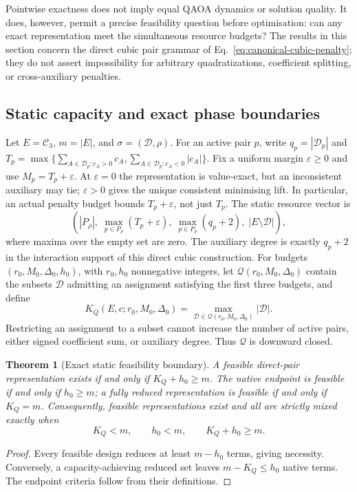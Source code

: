 \documentclass[a4paper,onecolumn,11pt,unpublished]{quantumarticle}
\newtheorem{theorem}[theorem]{Theorem}
\theoremstyle{remark}
\begin{document}
Pointwise exactness does not imply equal QAOA dynamics or solution quality.
It does, however, permit a precise feasibility question before optimisation:
can any exact representation meet the simultaneous resource budgets?
The results in this section concern the direct cubic pair grammar of
Eq.~\eqref{eq:canonical-cubic-penalty}; they do not assert impossibility for
arbitrary quadratizations, coefficient splitting, or cross-auxiliary penalties.

\subsection{Static capacity and exact phase boundaries}
Let $E=\mathcal C_3$, $m=|E|$, and $\sigma=(\mathcal D,\rho)$.
For an active pair $p$, write $q_p=|\mathcal D_p|$ and
$T_p=\max\{\sum_{A\in\mathcal D_p:c_A>0}c_A,
\sum_{A\in\mathcal D_p:c_A<0}|c_A|\}$.
Fix a uniform margin $\varepsilon\geq0$ and use
$M_p=T_p+\varepsilon$. At $\varepsilon=0$ the representation is value-exact,
but an inconsistent auxiliary may tie; $\varepsilon>0$ gives the unique
consistent minimising lift. In particular, an actual penalty budget bounds
$T_p+\varepsilon$, not just $T_p$.
The static resource vector is
\[
 \left(|P_\rho|,\;\max_{p\in P_\rho}(T_p+\varepsilon),\;
 \max_{p\in P_\rho}(q_p+2),\;|E\setminus\mathcal D|\right),
\]
where maxima over the empty set are zero. The auxiliary degree is exactly
$q_p+2$ in the interaction support of this direct cubic construction.
For budgets $(r_0,M_0,\Delta_0,h_0)$, with $r_0,h_0$ nonnegative integers,
let $\mathcal Q(r_0,M_0,\Delta_0)$ contain the subsets $\mathcal D$
admitting an assignment satisfying the first three budgets, and define
\begin{equation}
 K_Q(E,c;r_0,M_0,\Delta_0)
 =\max_{\mathcal D\in\mathcal Q(r_0,M_0,\Delta_0)}|\mathcal D|.
 \label{eq:static-reduction-capacity}
\end{equation}
Restricting an assignment to a subset cannot increase the number of active
pairs, either signed coefficient sum, or auxiliary degree. Thus
$\mathcal Q$ is downward closed.

\begin{theorem}[Exact static feasibility boundary]
\label{thm:static-phase-boundary}
A feasible direct-pair representation exists if and only if $K_Q+h_0\geq m$.
The native endpoint is feasible if and only if $h_0\geq m$; a fully reduced
representation is feasible if and only if $K_Q=m$. Consequently, feasible
representations exist and all are strictly mixed exactly when
\begin{equation}
 K_Q<m,\qquad h_0<m,\qquad K_Q+h_0\geq m.
 \label{eq:static-mixed-only}
\end{equation}
\end{theorem}
\begin{proof}
Every feasible design reduces at least $m-h_0$ terms, giving necessity.
Conversely, a capacity-achieving reduced set leaves $m-K_Q\leq h_0$ native
terms. The endpoint criteria follow from their definitions.
\end{proof}
\end{document}
